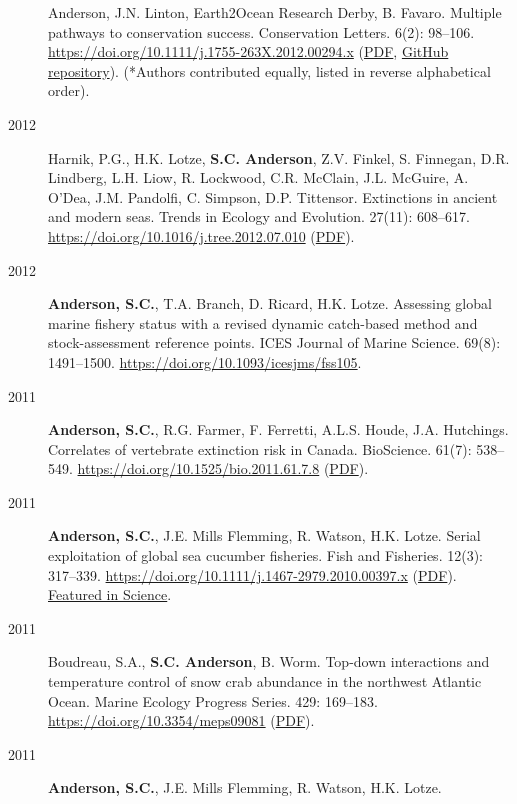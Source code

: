 \begin{description}
{Anderson}, J.N. Linton, Earth2Ocean Research Derby, B. Favaro. Multiple
pathways to conservation success. Conservation Letters. 6(2): 98--106.
\url{https://doi.org/10.1111/j.1755-263X.2012.00294.x}
(\href{https://www.dropbox.com/s/cxt848ng5x4hc4t/Phillis_etal_2012_Multiple_pathways_to_conservation_success.pdf?dl=1}{PDF},
\href{https://github.com/seananderson/conservation_pathways}{GitHub
repository}). (*Authors contributed equally, listed in reverse
alphabetical order).
\item[2012]
Harnik, P.G., H.K. Lotze, \textbf{S.C. Anderson}, Z.V. Finkel, S.
Finnegan, D.R. Lindberg, L.H. Liow, R. Lockwood, C.R. McClain, J.L.
McGuire, A. O'Dea, J.M. Pandolfi, C. Simpson, D.P. Tittensor.
Extinctions in ancient and modern seas. Trends in Ecology and Evolution.
27(11): 608--617. \url{https://doi.org/10.1016/j.tree.2012.07.010}
(\href{https://www.dropbox.com/s/rdn9685viqr37qy/Harnik_etal_2012_Extinctions_in_ancient_and_modern_seas.pdf?dl=1}{PDF}).
\item[2012]
\textbf{Anderson, S.C.}, T.A. Branch, D. Ricard, H.K. Lotze. Assessing
global marine fishery status with a revised dynamic catch-based method
and stock-assessment reference points. ICES Journal of Marine Science.
69(8): 1491--1500. \url{https://doi.org/10.1093/icesjms/fss105}.
\item[2011]
\textbf{Anderson, S.C.}, R.G. Farmer, F. Ferretti, A.L.S. Houde, J.A.
Hutchings. Correlates of vertebrate extinction risk in Canada.
BioScience. 61(7): 538--549.
\url{https://doi.org/10.1525/bio.2011.61.7.8}
(\href{https://www.dropbox.com/s/bt16dvi3idw3gdx/Anderson_etal_2011_BioScience_with_supplement.pdf?dl=1}{PDF}).
\item[2011]
\textbf{Anderson, S.C.}, J.E. Mills Flemming, R. Watson, H.K. Lotze.
Serial exploitation of global sea cucumber fisheries. Fish and
Fisheries. 12(3): 317--339.
\url{https://doi.org/10.1111/j.1467-2979.2010.00397.x}
(\href{https://www.dropbox.com/s/d8id4zxe9xv6jau/Anderson_etal_2011_seacucumbers_with_supplement.pdf?dl=1}{PDF}).
\href{http://www.sciencemag.org/content/331/6014/129.1.full}{Featured in
Science}.
\item[2011]
Boudreau, S.A., \textbf{S.C. Anderson}, B. Worm. Top-down interactions
and temperature control of snow crab abundance in the northwest Atlantic
Ocean. Marine Ecology Progress Series. 429: 169--183.
\url{https://doi.org/10.3354/meps09081}
(\href{http://www.int-res.com/articles/meps_oa/m429p169.pdf}{PDF}).
\item[2011]
\textbf{Anderson, S.C.}, J.E. Mills Flemming, R. Watson, H.K. Lotze.

\end{description}
